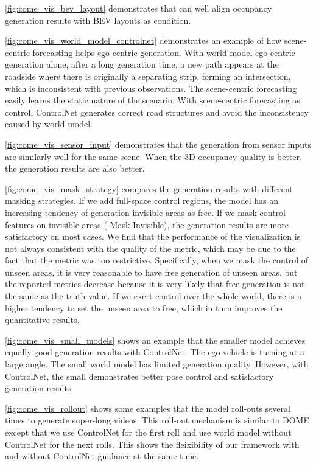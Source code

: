 \cref{fig:come_vis_bev_layout} demonstrates that \mtd{} can well align occupancy generation results with BEV layouts as condition.

\cref{fig:come_vis_world_model_controlnet} demonstrates an example of how scene-centric forecasting helps ego-centric generation. With \mtd{} world model ego-centric generation alone, after a long generation time, a new path appears at the roadside where there is originally a separating strip, forming an intersection, which is inconsistent with previous observations. The scene-centric forecasting easily learns the static nature of the scenario. With scene-centric forecasting as control, \mtd{} ControlNet generates correct road structures and avoid the inconsistency caused by \mtd{} world model.

\cref{fig:come_vis_sensor_input} demonstrates that the generation from sensor inputs are similarly well for the same scene. When the 3D occupancy quality is better, the generation results are also better.

\cref{fig:come_vis_mask_strategy} compares the generation results with different masking strategies. If we add full-space control regions, the model has an increasing tendency of generation invisible areas as free. If we mask control features on invisible areas (\mtd{}-Mask Invisible), the generation results are more satisfactory on most cases. We find that the performance of the visualization is not always consistent with the quality of the metric, which may be due to the fact that the metric was too restrictive. Specifically, when we mask the control of unseen areas, it is very reasonable to have free generation of unseen areas, but the reported metrics decrease because it is very likely that free generation is not the same as the truth value. If we exert control over the whole world, there is a higher tendency to set the unseen area to free, which in turn improves the quantitative results.


\cref{fig:come_vis_small_models} shows an example that the smaller model achieves equally good generation results with ControlNet. The ego vehicle is turning at a large angle. The small world model has limited generation quality. However, with ControlNet, the small \mtd{} demonstrates better pose control and satisfactory generation results. 

\cref{fig:come_vis_rollout} shows some examples that the model roll-outs several times to generate super-long videos. This roll-out mechanism is similar to DOME\cite{dome} except that we use \mtd{} ControlNet for the first roll and use \mtd{} world model without ControlNet for the next rolls. This shows the fleixibility of our framework with and without ControlNet guidance at the same time. 




